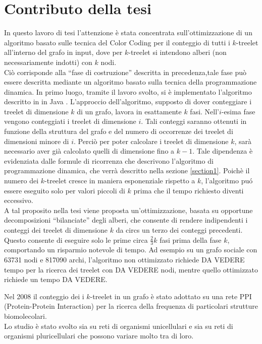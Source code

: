\section{Contributo della tesi}

In questo lavoro di tesi l'attenzione \`e stata concentrata  sull'ottimizzazione di un algoritmo basato sulle tecnica del Color Coding per il conteggio di tutti i $k$-treelet all'interno del grafo in input, dove per $ k $-treelet  si intendono alberi (non necessariamente indotti) con $ k $ nodi.\\
Ci\`o corrisponde alla ``fase di costruzione'' descritta in precedenza,tale fase pu\`o essere descritta mediante un algoritmo basato sulla tecnica della programmazione dinamica.
In primo luogo, tramite il lavoro svolto, si \`e implementato l'algoritmo descritto in  \cite{bressan2018motif} in Java .
L'approccio dell'algoritmo, supposto di dover conteggiare i treelet di dimensione $ k $ di un grafo, lavora in esattamente  $ k $ fasi.
Nell'$ i $-esima fase vengono conteggiati i treelet di dimensione $ i $.
Tali conteggi saranno ottenuti in funzione della struttura del grafo e del numero di occorrenze dei treelet di dimensioni minore di $ i $.
Perci\`o per poter calcolare i treelet di dimensione $ k $, sar\`a necessario aver gi\`a calcolato quelli di dimensione fino a $ k-1 $.
Tale dipendenza \`e evidenziata dalle formule di ricorrenza che descrivono l'algoritmo di programmazione dinamica, che verr\`a descritto nella sezione \ref{section1}.
Poich\`e il numero dei $ k $-treelet cresce in maniera esponenziale rispetto a $ k $, l'algoritmo pu\'o essere eseguito solo per valori piccoli di $ k $ prima che il tempo richiesto diventi eccessivo.\\
A tal proposito nella tesi viene proposta un'ottimizzazione, basata su opportune decomposizioni ``bilanciate'' degli alberi, che consente di rendere indipendenti i conteggi dei treelet di dimensione $ k $ da circs un terzo dei conteggi precedenti.
Questo consente di eseguire solo le prime  circa $\frac{2}{3} k $  fasi prima della fase $ k $, comportando un risparmio notevole di tempo.
Ad esempio su un grafo sociale con 63731 nodi e 817090 archi, l'algoritmo non ottimizzato richiede DA VEDERE tempo per la ricerca dei treelet con DA VEDERE nodi, mentre quello ottimizzato richiede un tempo DA VEDERE.

Nel 2008 il conteggio dei i $ k $-treelet in un grafo \`e stato adottato su una rete PPI (Protein-Protein Interaction) per la ricerca della frequenza di particolari strutture biomolecolari.\\
Lo studio \`e stato svolto sia su reti di organismi unicellulari e sia su reti di organismi pluricellulari che possono variare molto tra di loro.


